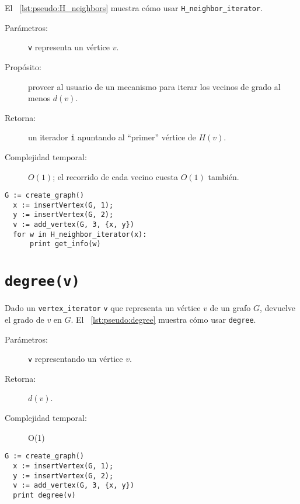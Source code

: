 \documentclass[%
    a4paper,%
    fontsize=12pt,%
    DIV=12,
    twoside,%
    openright,%
    titlepage=true,%
    headsepline,%
    toc=bibliography,%
    parskip=half,%
    cleardoublepage=empty,%
    headings=big,%
]{scrbook}
\makeatletter
\newcommand{\Code}[2][]{\lstinline[basicstyle={\ttfamily},#1]@#2@}
\makeatother
\begin{document}
El \lstlistingname~\ref{lst:pseudo:H_neighbors} muestra cómo usar \Code{H_neighbor_iterator}.


\begin{description}
  \item [Parámetros:] \Code{v} representa un vértice $v$.
  \item [Propósito:] proveer al usuario de un mecanismo para iterar los vecinos de grado al menos $d(v)$.
  \item [Retorna:] un iterador \Code{i} apuntando al ``primer'' vértice de $H(v)$.
  \item [Complejidad temporal:] $O(1)$; el recorrido de cada vecino cuesta $O(1)$ también.
\end{description}


\begin{lstlisting}[caption={Ejemplo de uso de \Code{H_neighbor_iterator} para imprimir 3.},gobble=2,float=ht,label={lst:pseudo:H_neighbors},emph={H_neighbors}]
  G := create_graph()
  x := insertVertex(G, 1);
  y := insertVertex(G, 2);
  v := add_vertex(G, 3, {x, y})
  for w in H_neighbor_iterator(x):
      print get_info(w)
\end{lstlisting}

\section{\texorpdfstring{\Code{degree(v)}}{degree(v)}}
\label{sec:tad grafo:degree}

Dado un \Code{vertex_iterator} \Code{v} que representa un vértice $v$ de un grafo $G$, devuelve el grado de $v$ en $G$.  El \lstlistingname~\ref{lst:pseudo:degree} muestra cómo usar \Code{degree}.


\begin{description}
  \item [Parámetros:] \Code{v} representando un vértice $v$.
  \item [Retorna:] $d(v)$.
  \item [Complejidad temporal:] O(1)
\end{description}


\begin{lstlisting}[caption={Ejemplo de uso de \Code{degree} para imprimir $2$.},gobble=2,float=ht,label={lst:pseudo:degree},emph={degree}]
  G := create_graph()
  x := insertVertex(G, 1);
  y := insertVertex(G, 2);
  v := add_vertex(G, 3, {x, y})
  print degree(v)
\end{lstlisting}
\end{document}
